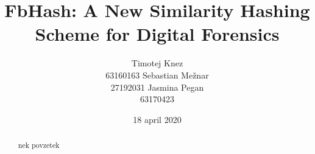 \documentclass{acm_proc_article-sp}
\begin{document}
\title{FbHash: A New Similarity Hashing Scheme for Digital Forensics}

\author{
\alignauthor
Timotej Knez \\
63160163%
\alignauthor
Sebastian Mežnar\\
27192031 %
\alignauthor 
Jasmina Pegan \\
63170423%
}

\date{18 april 2020}

\maketitle
\begin{abstract}
nek povzetek
\end{abstract}



\end{document}
